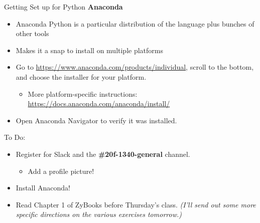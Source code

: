 \begin{frame}{Getting Set up for Python}
\protect\hypertarget{getting-set-up-for-python}{}
\textbf{Anaconda}

\begin{itemize}
\item
  Anaconda Python is a particular distribution of the language plus
  bunches of other tools
\item
  Makes it a snap to install on multiple platforms
\item
  Go to \url{https://www.anaconda.com/products/individual}, scroll to
  the bottom, and choose the installer for your platform.

  \begin{itemize}
  \tightlist
  \item
    More platform-specific instructions:
    \url{https://docs.anaconda.com/anaconda/install/}
  \end{itemize}
\item
  Open Anaconda Navigator to verify it was installed.
\end{itemize}
\end{frame}

\begin{frame}{To Do:}
\protect\hypertarget{to-do}{}
\begin{itemize}
\tightlist
\item
  Register for Slack and the \textbf{\#20f-1340-general} channel.

  \begin{itemize}
  \tightlist
  \item
    Add a profile picture!
  \end{itemize}
\item
  Install Anaconda!
\item
  Read Chapter 1 of ZyBooks before Thursday's class. \emph{(I'll send
  out some more specific directions on the various exercises tomorrow.)}
\end{itemize}
\end{frame}
